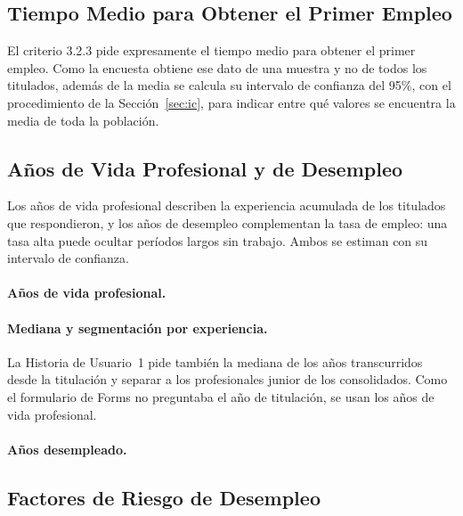 \documentclass[12pt, a4paper]{article}
\begin{document}


\subsection{Tiempo Medio para Obtener el Primer Empleo}

El criterio 3.2.3 pide expresamente el tiempo medio para obtener el
primer empleo. Como la encuesta obtiene ese dato de una muestra y no de
todos los titulados, además de la media se calcula su intervalo de
confianza del 95\%, con el procedimiento de la Sección~\ref{sec:ic}, para
indicar entre qué valores se encuentra la media de toda la población.



\subsection{Años de Vida Profesional y de Desempleo}

Los años de vida profesional describen la experiencia acumulada de los
titulados que respondieron, y los años de desempleo complementan la
tasa de empleo: una tasa alta puede ocultar períodos largos sin trabajo.
Ambos se estiman con su intervalo de confianza.

\paragraph{Años de vida profesional.}



\paragraph{Mediana y segmentación por experiencia.} La Historia de
Usuario~1 pide también la mediana de los años transcurridos desde la
titulación y separar a los profesionales junior de los consolidados. Como
el formulario de Forms no preguntaba el año de titulación, se usan los
años de vida profesional.



\paragraph{Años desempleado.}



\subsection{Factores de Riesgo de Desempleo}\label{sec:factores-riesgo}
\end{document}
